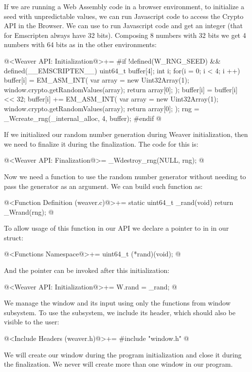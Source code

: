 If we are running a Web Assembly code in a browser environment, to
initialize a seed with unpredictable values, we can run Javascript
code to access the Crypto API in the Browser. We can
use  to run Javascript code and get an
integer (that for Emscripten always have 32 bits). Composing 8 numbers
with 32 bits we get 4 numbers with 64 bits as in the other
environments:

\iniciocodigo
@<Weaver API: Initialization@>+=
#if !defined(W_RNG_SEED) && defined(__EMSCRIPTEN__)
{
  uint64_t buffer[4];
  int i;
  for(i = 0; i < 4; i ++){
    buffer[i] = EM_ASM_INT({
      var array = new Uint32Array(1);
      window.crypto.getRandomValues(array);
      return array[0];
    });
    buffer[i] = buffer[i] << 32;
    buffer[i] += EM_ASM_INT({
      var array = new Uint32Array(1);
      window.crypto.getRandomValues(array);
      return array[0];
    });
  }
  rng = _Wcreate_rng(_internal_alloc, 4, buffer);
}
#endif
@
\fimcodigo

If we initialized our random number generation during Weaver
initialization, then we need to finalize it during the
finalization. The code for this is:

\iniciocodigo
@<Weaver API: Finalization@>=
_Wdestroy_rng(NULL, rng);
@
\fimcodigo

Now we need a function to use the random number generator without
needing to pass the generator as an argument. We can build such
function as:

\iniciocodigo
@<Function Definition (weaver.c)@>+=
static uint64_t _rand(void){
  return _Wrand(rng);
}
@
\fimcodigo

To allow usage of this function in our API we declare a pointer to in
in our  struct:

\iniciocodigo
@<Functions Namespace@>+=
uint64_t (*rand)(void);
@
\fimcodigo

And the pointer can be invoked after this initialization:

\iniciocodigo
@<Weaver API: Initialization@>+=
W.rand = _rand;
@
\fimcodigo


We manage the window and its input using only the functions from
window subsystem. To use the subsystem, we include its header, which
should also be visible to the user:

\iniciocodigo
@<Include Headers (weaver.h)@>+=
#include "window.h"
@
\fimcodigo

We will create our window during the program initialization and close
it during the finalization. We never will create more than one window
in our program.

